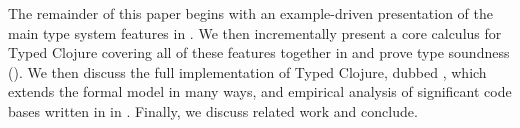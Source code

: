 
\noindent
 The remainder of this paper begins with an example-driven
 presentation of the main type system features in
 . We then incrementally present a core calculus
 for Typed Clojure covering all of these features together in
  and prove type soundness
 (). We then discuss the full implementation of
 Typed Clojure, dubbed \coretyped{}, which extends the formal model in
 many ways, and empirical analysis of significant code bases written
 in \coretyped{} in . Finally, we discuss
 related work and conclude.

